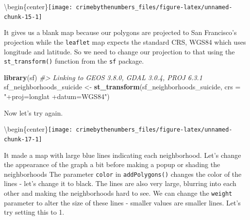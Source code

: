 \documentclass[
  12pt,
]{book}
\newenvironment{Shaded}{\begin{snugshade}}{\end{snugshade}}
\newcommand{\CommentTok}[1]{\textcolor[rgb]{0.37,0.37,0.37}{\textit{#1}}}
\newcommand{\DataTypeTok}[1]{\textcolor[rgb]{0.27,0.27,0.27}{#1}}
\newcommand{\KeywordTok}[1]{\textcolor[rgb]{0.27,0.27,0.27}{\textbf{#1}}}
\newcommand{\NormalTok}[1]{#1}
\newcommand{\OperatorTok}[1]{\textcolor[rgb]{0.43,0.43,0.43}{\textbf{#1}}}
\newcommand{\StringTok}[1]{\textcolor[rgb]{0.5,0.5,0.5}{#1}}
\begin{document}
\textbackslash begin\{center\}\texttt{[image: crimebythenumbers\_files/figure-latex/unnamed-chunk-15-1]}

It gives us a blank map because our polygons are projected to San Francisco's projection while the \texttt{leaflet} map expects the standard CRS, WGS84 which uses longitude and latitude. So we need to change our projection to that using the \texttt{st\_transform()} function from the \texttt{sf} package.

\begin{Shaded}
\begin{Highlighting}[]
\KeywordTok{library}\NormalTok{(sf)}
\CommentTok{\#\textgreater{} Linking to GEOS 3.8.0, GDAL 3.0.4, PROJ 6.3.1}
\NormalTok{sf\_neighborhoods\_suicide \textless{}{-}}\StringTok{ }\KeywordTok{st\_transform}\NormalTok{(sf\_neighborhoods\_suicide,}
                                        \DataTypeTok{crs =} \StringTok{"+proj=longlat +datum=WGS84"}\NormalTok{)}
\end{Highlighting}
\end{Shaded}

Now let's try again.

\begin{Shaded}
\end{Shaded}

\textbackslash begin\{center\}\texttt{[image: crimebythenumbers\_files/figure-latex/unnamed-chunk-17-1]}

It made a map with large blue lines indicating each neighborhood. Let's change the appearance of the graph a bit before making a popup or shading the neighborhoods The parameter \texttt{color} in \texttt{addPolygons()} changes the color of the lines - let's change it to black. The lines are also very large, blurring into each other and making the neighborhoods hard to see. We can change the \texttt{weight} parameter to alter the size of these lines - smaller values are smaller lines. Let's try setting this to 1.
\end{document}
